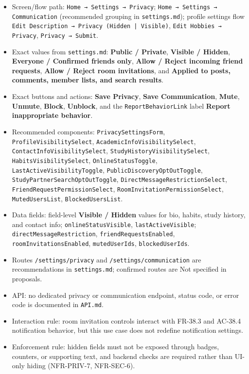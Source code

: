 \documentclass[12pt]{article}
\begin{document}
\begin{itemize}
\item Screen/flow path: \texttt{Home → Settings → Privacy}; \texttt{Home → Settings → Communication} (recommended grouping in \texttt{settings.md}); profile settings flow \texttt{Edit Description → Privacy (Hidden | Visible)}, \texttt{Edit Hobbies → Privacy}, \texttt{Privacy → Submit}.
\item Exact values from \texttt{settings.md}: \textbf{Public / Private}, \textbf{Visible / Hidden}, \textbf{Everyone / Confirmed friends only}, \textbf{Allow / Reject incoming friend requests}, \textbf{Allow / Reject room invitations}, and \textbf{Applied to posts, comments, member lists, and search results}.
\item Exact buttons and actions: \textbf{Save Privacy}, \textbf{Save Communication}, \textbf{Mute}, \textbf{Unmute}, \textbf{Block}, \textbf{Unblock}, and the \texttt{ReportBehaviorLink} label \textbf{Report inappropriate behavior}.
\item Recommended components: \texttt{PrivacySettingsForm}, \texttt{ProfileVisibilitySelect}, \texttt{AcademicInfoVisibilitySelect}, \texttt{ContactInfoVisibilitySelect}, \texttt{StudyHistoryVisibilitySelect}, \texttt{HabitsVisibilitySelect}, \texttt{OnlineStatusToggle}, \texttt{LastActiveVisibilityToggle}, \texttt{PublicDiscoveryOptOutToggle}, \texttt{StudyPartnerSearchOptOutToggle}, \texttt{DirectMessageRestrictionSelect}, \texttt{FriendRequestPermissionSelect}, \texttt{RoomInvitationPermissionSelect}, \texttt{MutedUsersList}, \texttt{BlockedUsersList}.
\item Data fields: field-level \textbf{Visible / Hidden} values for bio, habits, study history, and contact info; \texttt{onlineStatusVisible}, \texttt{lastActiveVisible}; \texttt{directMessageRestriction}, \texttt{friendRequestsEnabled}, \texttt{roomInvitationsEnabled}, \texttt{mutedUserIds}, \texttt{blockedUserIds}.
\item Routes \texttt{/settings/privacy} and \texttt{/settings/communication} are recommendations in \texttt{settings.md}; confirmed routes are Not specified in proposals.
\item API: no dedicated privacy or communication endpoint, status code, or error code is documented in \texttt{API.md}.
\item Interaction rule: room invitation controls interact with FR-38.3 and AC-38.4 notification behavior, but this use case does not redefine notification settings.
\item Enforcement rule: hidden fields must not be exposed through badges, counters, or supporting text, and backend checks are required rather than UI-only hiding (NFR-PRIV-7, NFR-SEC-6).
\end{itemize}
\par\medskip
\end{document}
